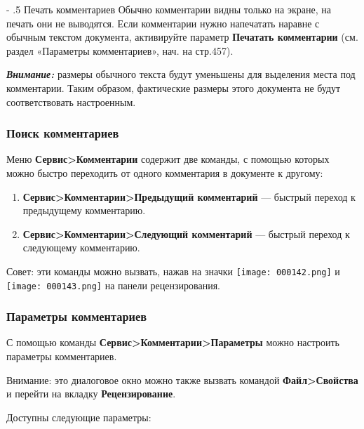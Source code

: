 ﻿\documentclass[a4paper,10pt]{article}
\makeatletter
\renewcommand\paragraph{%
   \@startsection{paragraph}{4}{0mm}%
      {-\baselineskip}%
      {.5\baselineskip}%
      {\normalfont\normalsize\bfseries}}
\makeatother
\begin{document}
\paragraph{Печать комментариев}
Обычно комментарии видны только на экране, на печать они не выводятся. Если комментарии нужно напечатать наравне с обычным текстом документа, активируйте параметр \textbf{Печатать комментарии} (см. раздел «Параметры комментариев», нач. на стр.457).

\begin{mdframed}[backgroundcolor=blue!10]
\textbf{\textit{Внимание:}} размеры обычного текста будут уменьшены для выделения места под комментарии. Таким образом, фактические размеры этого документа не будут соответствовать настроенным.
\end{mdframed}

\subsubsection{Поиск комментариев}
Меню \textbf{Сервис>Комментарии} содержит две команды, с помощью которых можно быстро переходить от одного комментария в документе к другому:
\begin{enumerate}
 \item \textbf{Сервис>Комментарии>Предыдущий комментарий} — быстрый переход к предыдущему комментарию.
 \item \textbf{Сервис>Комментарии>Следующий комментарий} — быстрый переход к следующему комментарию.
\end{enumerate}

Совет: эти команды можно вызвать, нажав на значки \texttt{[image: 000142.png]} и \texttt{[image: 000143.png]} на панели рецензирования.

\subsubsection{Параметры комментариев}
С помощью команды \textbf{Сервис>Комментарии>Параметры} можно настроить параметры комментариев.

Внимание: это диалоговое окно можно также вызвать командой \textbf{Файл>Свойства} и перейти на вкладку \textbf{Рецензирование}.

Доступны следующие параметры:
\end{document}

